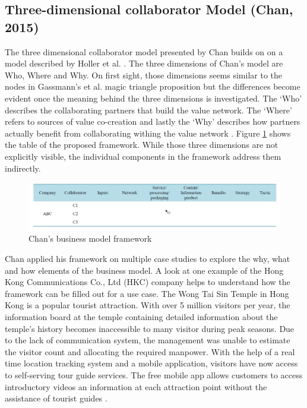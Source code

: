 	\subsection{Three-dimensional collaborator Model (Chan, 2015)}

		The three dimensional collaborator model presented by Chan \cite{chan} builds on on a model described by Holler et al. \cite{holler}. The three dimensions of Chan's model are Who, Where and Why. On first sight, those dimensions seems similar to the nodes in Gassmann's et al. magic triangle proposition but the differences become evident once the meaning behind the three dimensions is investigated. The `Who' describes the collaborating partners that build the value network. The `Where' refers to sources of value co-creation and lastly the `Why' describes how partners actually benefit from collaborating withing the value network \cite{chan}. Figure \ref{fig:chan} shows the table of the proposed framework. While those three dimensions are not explicitly visible, the individual components in the framework address them indirectly.

		\begin{figure}[ht]
		    \begin{center}
		    \includegraphics[scale=0.5]{Talk11/chan.png}
		    \end{center}
		    \caption{Chan's business model framework \cite[p.559]{chan}}
		    \label{fig:chan}
		\end{figure}

		Chan applied his framework on multiple case studies to explore the why, what and how elements of the business model. A look at one example of the Hong Kong Communications Co., Ltd (HKC) company helps to understand how the framework can be filled out for a use case. The Wong Tai Sin Temple in Hong Kong is a popular tourist attraction. With over 5 million visitors per year, the information board at the temple containing detailed information about the temple's history becomes inaccessible to many visitor during peak seasons. Due to the lack of communication system, the management was unable to estimate the visitor count and allocating the required manpower. With the help of a real time location tracking system and a mobile application, visitors have now access to self-serving tour guide services. The free mobile app allows customers to access introductory videos an information at each attraction point without the assistance of tourist guides \cite[p. 560]{chan}. 

